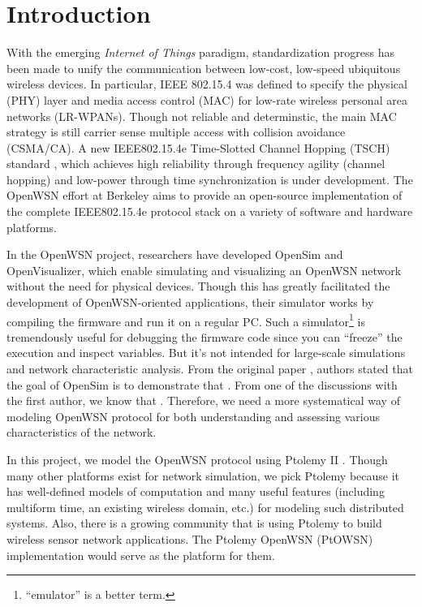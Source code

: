 \section{Introduction}
\label{sec:introduction}

With the emerging {\em Internet of Things} paradigm, standardization progress has been made to unify the communication between low-cost, low-speed ubiquitous wireless devices. In particular, IEEE 802.15.4 \cite{IEEE802.15.4} was defined to specify the physical (PHY) layer and media access control (MAC) for low-rate wireless personal area networks (LR-WPANs). Though not reliable and determinstic, the main MAC strategy is still carrier sense multiple access with collision avoidance (CSMA/CA). A new IEEE802.15.4e Time-Slotted Channel Hopping (TSCH) standard \cite{IEEE802.15.4e}, which achieves high reliability through frequency agility (channel hopping) and low-power through time synchronization is under development. The OpenWSN \cite{watteyne2012openwsn} effort at Berkeley aims to provide an open-source implementation of the complete IEEE802.15.4e protocol stack on a variety of software and hardware platforms. 

In the OpenWSN project, researchers have developed OpenSim and OpenVisualizer, which enable simulating and visualizing an OpenWSN network without the need for physical devices. Though this has greatly facilitated the development of OpenWSN-oriented applications, their simulator works by compiling the firmware and run it on a regular PC. Such a simulator\footnote{ ``emulator'' is a better term.} is tremendously useful for debugging the firmware code since you can ``freeze'' the execution and inspect variables. But it's not intended for large-scale simulations and network characteristic analysis. From the original paper \cite{watteyne2012openwsn}, authors stated that the goal of OpenSim is to demonstrate that . From one of the discussions with the first author, we know that . Therefore, we need a more systematical way of modeling OpenWSN protocol for both understanding and assessing various characteristics of the network. 

In this project, we model the OpenWSN protocol using Ptolemy II \cite{PtolemyVol1:04, davis1999overview}. Though many other platforms \cite{mccanne1995ns, varga2001omnet++} exist for network simulation, we pick Ptolemy because it has well-defined models of computation and many useful features (including multiform time, an existing wireless domain, etc.) for modeling such distributed systems. Also, there is a growing community that is using Ptolemy to build wireless sensor network applications. The Ptolemy OpenWSN (PtOWSN) implementation would serve as the platform for them. 



